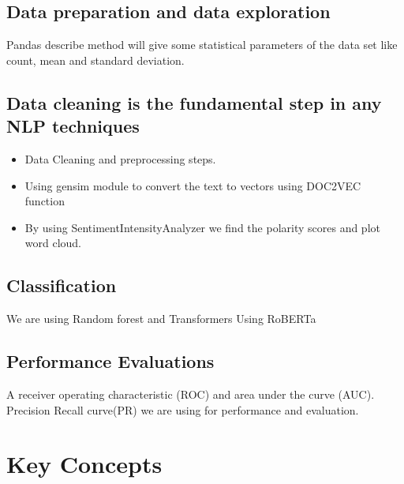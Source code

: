 \subsection{Data preparation and data exploration}

Pandas describe method will give some statistical parameters of the data set like count, mean and standard deviation.

\subsection{Data cleaning is the fundamental step in any NLP techniques}
\begin{itemize}

\item Data Cleaning and preprocessing steps.
\item Using gensim module to convert the text to vectors using DOC2VEC function 
\item By using SentimentIntensityAnalyzer we find the polarity scores and plot word cloud.
\end{itemize}

\subsection{ Classification}

We are using Random forest and Transformers Using RoBERTa

\subsection{Performance Evaluations }

A receiver operating characteristic (ROC) and area under the curve (AUC).
Precision Recall curve(PR) we are using for performance and evaluation.
\section{Key Concepts}
